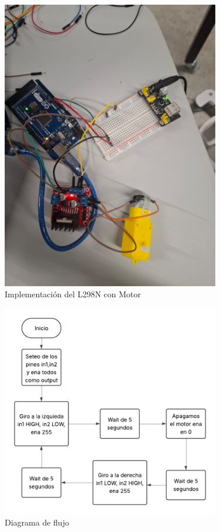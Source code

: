 \documentclass{article}
\begin{document}
\begin{figure}[H]
    \centering
    \includegraphics[width=0.85\textwidth]{./img/ckpt_presencial_298.jpeg}
    \caption{Implementación del L298N con Motor}
    \label{fig:motor_driver}
\end{figure}

\begin{figure}[H]
    \centering
    \includegraphics[width=0.85\textwidth]{./img/flujo_298.png}
    \caption{Diagrama de flujo}
    \label{fig:motor_driver}
\end{figure}
\end{document}
